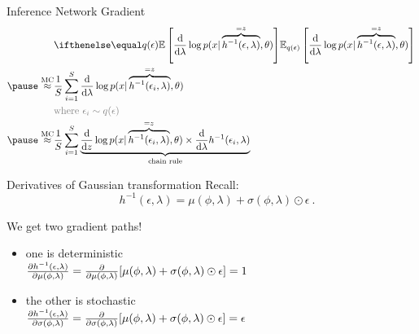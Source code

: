 \documentclass[14pt]{beamer}
\begin{document}
\begin{frame}{Inference Network Gradient}
\vspace{-10pt}
\begin{equation*}
\begin{aligned}
&\E[q(\epsilon)]{\dv{\lambda} \log p(x| \overbrace{h^{-1}(\epsilon, \lambda)}^{=z}, \theta)} \\ \pause
\overset{\text{MC}}{\approx} &\frac{1}{S}\sum_{i=1}^{S} \dv{\lambda} \log p(x| \overbrace{h^{-1}(\epsilon_i, \lambda)}^{=z}, \theta) \\
&\textcolor{gray}{\text{where }\epsilon_i \sim q(\epsilon)} \\ \pause
\overset{\text{MC}}{\approx} &\frac{1}{S}\sum_{i=1}^{S} \underbrace{\dv{z} \log p(x| \overbrace{h^{-1}(\epsilon_i, \lambda)}^{=z}, \theta) \times \dv{\lambda} h^{-1}(\epsilon_i, \lambda)}_{\text{chain rule}}
\end{aligned}
\end{equation*}
\end{frame}

\begin{frame}{Derivatives of Gaussian transformation}
Recall: $$\quad h^{-1}(\epsilon, \lambda) = \mu(\phi,\lambda) + \sigma(\phi,\lambda) \odot \epsilon \ . $$

We get two gradient paths! \pause \\

\begin{itemize}
	\item one is \alert{deterministic}\\
	$\pdv{h^{-1}(\epsilon, \lambda)}{\mu(\phi,\lambda)} = \pdv{\mu(\phi,\lambda)}[\mu(\phi,\lambda) + \sigma(\phi,\lambda) \odot \epsilon] = 1$ \pause
	\item the other is  \alert{stochastic}\\
	$\pdv{h^{-1}(\epsilon, \lambda)}{\sigma(\phi,\lambda)} = \pdv{\sigma(\phi,\lambda)}[ \mu(\phi,\lambda) + \sigma(\phi,\lambda) \odot \epsilon] = \epsilon$
\end{itemize}

\end{frame}
\end{document}

